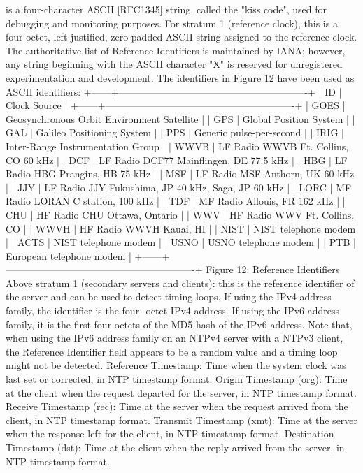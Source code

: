 is a four-character ASCII [RFC1345] string, called the "kiss code",
 used for debugging and monitoring purposes. For stratum 1 (reference
 clock), this is a four-octet, left-justified, zero-padded ASCII
 string assigned to the reference clock. The authoritative list of
 Reference Identifiers is maintained by IANA; however, any string
 beginning with the ASCII character "X" is reserved for unregistered
 experimentation and development. The identifiers in Figure 12 have
 been used as ASCII identifiers:
 +------+----------------------------------------------------------+
 | ID | Clock Source |
 +------+----------------------------------------------------------+
 | GOES | Geosynchronous Orbit Environment Satellite |
 | GPS | Global Position System |
 | GAL | Galileo Positioning System |
 | PPS | Generic pulse-per-second |
 | IRIG | Inter-Range Instrumentation Group |
 | WWVB | LF Radio WWVB Ft. Collins, CO 60 kHz |
 | DCF | LF Radio DCF77 Mainflingen, DE 77.5 kHz |
 | HBG | LF Radio HBG Prangins, HB 75 kHz |
 | MSF | LF Radio MSF Anthorn, UK 60 kHz |
 | JJY | LF Radio JJY Fukushima, JP 40 kHz, Saga, JP 60 kHz |
 | LORC | MF Radio LORAN C station, 100 kHz |
 | TDF | MF Radio Allouis, FR 162 kHz |
 | CHU | HF Radio CHU Ottawa, Ontario |
 | WWV | HF Radio WWV Ft. Collins, CO |
 | WWVH | HF Radio WWVH Kauai, HI |
 | NIST | NIST telephone modem |
 | ACTS | NIST telephone modem |
 | USNO | USNO telephone modem |
 | PTB | European telephone modem |
 +------+----------------------------------------------------------+
 Figure 12: Reference Identifiers
 Above stratum 1 (secondary servers and clients): this is the
 reference identifier of the server and can be used to detect timing
 loops. If using the IPv4 address family, the identifier is the four-
 octet IPv4 address. If using the IPv6 address family, it is the
first four octets of the MD5 hash of the IPv6 address. Note that,
 when using the IPv6 address family on an NTPv4 server with a NTPv3
 client, the Reference Identifier field appears to be a random value
 and a timing loop might not be detected.
 Reference Timestamp: Time when the system clock was last set or
 corrected, in NTP timestamp format.
 Origin Timestamp (org): Time at the client when the request departed
 for the server, in NTP timestamp format.
 Receive Timestamp (rec): Time at the server when the request arrived
 from the client, in NTP timestamp format.
 Transmit Timestamp (xmt): Time at the server when the response left
 for the client, in NTP timestamp format.
 Destination Timestamp (dst): Time at the client when the reply
 arrived from the server, in NTP timestamp format.
